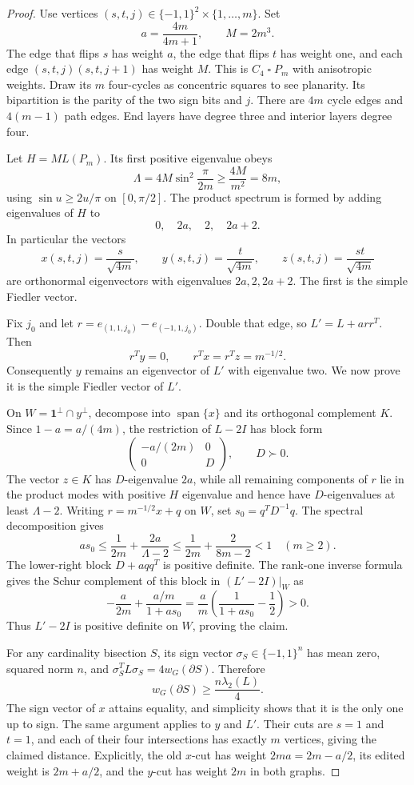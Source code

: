 \documentclass[11pt]{article}
\newcommand{\one}{\boldsymbol 1}
\begin{document}
\begin{proof}
Use vertices $(s,t,j)\in\{-1,1\}^2\times\{1,\ldots,m\}$.
Set
\[
        a=\frac{4m}{4m+1},\qquad M=2m^3.
\]
The edge that flips $s$ has weight $a$, the edge that flips $t$ has
weight one, and each edge $(s,t,j)(s,t,j+1)$ has weight $M$.
This is $C_4\mathbin\square P_m$ with anisotropic weights. Draw its
$m$ four-cycles as concentric squares to see planarity. Its bipartition
is the parity of the two sign bits and $j$. There are $4m$ cycle edges
and $4(m-1)$ path edges. End layers have degree three and interior
layers degree four.

Let $H=M L(P_m)$. Its first positive eigenvalue obeys
\[
 \Lambda=4M\sin^2\!\frac{\pi}{2m}
       \ge\frac{4M}{m^2}=8m,
\]
using $\sin u\ge2u/\pi$ on $[0,\pi/2]$.
The product spectrum is formed by adding eigenvalues of $H$ to
\[
                 0,\quad2a,\quad2,\quad2a+2.
\]
In particular the vectors
\[
 x(s,t,j)=\frac{s}{\sqrt{4m}},\qquad
 y(s,t,j)=\frac{t}{\sqrt{4m}},\qquad
 z(s,t,j)=\frac{st}{\sqrt{4m}}
\]
are orthonormal eigenvectors with eigenvalues $2a,2,2a+2$.
The first is the simple Fiedler vector.

Fix $j_0$ and let $r=e_{(1,1,j_0)}-e_{(-1,1,j_0)}$. Double that
edge, so $L'=L+a rr^T$. Then
\[
 r^Ty=0,\qquad r^Tx=r^Tz=m^{-1/2}.
\]
Consequently $y$ remains an eigenvector of $L'$ with eigenvalue two.
We now prove it is the simple Fiedler vector of $L'$.

On $W=\one^\perp\cap y^\perp$, decompose into $\operatorname{span}\{x\}$
and its orthogonal complement $K$. Since
$1-a=a/(4m)$, the restriction of $L-2I$ has block form
\[
    \begin{pmatrix}-a/(2m)&0\\0&D\end{pmatrix},\qquad D\succ0.
\]
The vector $z\in K$ has $D$-eigenvalue $2a$, while all remaining
components of $r$ lie in the product modes with positive $H$ eigenvalue
and hence have $D$-eigenvalues at least $\Lambda-2$.
Writing $r=m^{-1/2}x+q$ on $W$, set $s_0=q^TD^{-1}q$.
The spectral decomposition gives
\[
 a s_0\le\frac1{2m}+\frac{2a}{\Lambda-2}
       \le\frac1{2m}+\frac2{8m-2}<1 \quad(m\ge2).
\]
The lower-right block $D+aqq^T$ is positive definite. The rank-one
inverse formula gives the Schur complement of this block in
$(L'-2I)|_W$ as
\[
 -\frac a{2m}+\frac{a/m}{1+a s_0}
       =\frac am\left(\frac1{1+a s_0}-\frac12\right)>0.
\]
Thus $L'-2I$ is positive definite on $W$, proving the claim.

For any cardinality bisection $S$, its sign vector $\sigma_S\in\{-1,1\}^n$
has mean zero, squared norm $n$, and
$\sigma_S^TL\sigma_S=4w_G(\partial S)$. Therefore
\[
       w_G(\partial S)\ge\frac{n\lambda_2(L)}4.
\]
The sign vector of $x$ attains equality, and simplicity shows that it is
the only one up to sign. The same argument applies to $y$ and $L'$.
Their cuts are $s=1$ and $t=1$, and each of their four intersections
has exactly $m$ vertices, giving the claimed distance. Explicitly, the
old $x$-cut has weight $2ma=2m-a/2$, its edited weight is $2m+a/2$,
and the $y$-cut has weight $2m$ in both graphs.


\end{proof}
\end{document}
